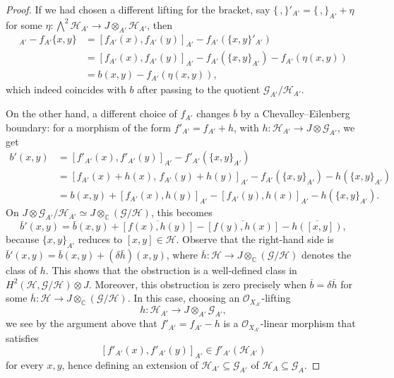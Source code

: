 \documentclass[10pt,a4paper]{amsart}
\newcommand\C{\mathbb{C}}
\newcommand{\OO}{\mathcal{O}}
\begin{document}
\begin{proof}
If we had chosen a different lifting for the bracket, say $\{\,,\}'_{A'}=\{\,,\}_{A'}+\eta$ for some $\eta:\bigwedge^2\mathcal H_{A'}\to J\otimes_{A'}\mathcal H_{A'}$, then 
\begin{align*}
[f_{A'}(x),f_{A'}(y)]_{A'} - f_{A'}\{x,y\}
&=[f_{A'}(x),f_{A'}(y)]_{A'}-f_{A'}(\{x,y\}'_{A'}) \\
&=[f_{A'}(x),f_{A'}(y)]_{A'}-f_{A'}(\{x,y\}_{A'})-f_{A'}(\eta(x,y)) \\
&=b(x,y)-f_{A'}(\eta(x,y)),
\end{align*}
which indeed coincides with $b$ after passing to the quotient $\mathcal G_{A'}/\mathcal H_{A'}$.

On the other hand, a different choice of $f_{A'}$ changes $\overline{b}$ by a Chevalley--Eilenberg boundary: for a morphism of the form $f'_{A'}=f_{A'}+h$, with $h:\mathcal H_{A'}\to J\otimes\mathcal G_{A'}$, we get
\begin{align*}
b'(x,y)
&=
[f'_{A'}(x),f'_{A'}(y)]_{A'}-f'_{A'}(\{x,y\}_{A'}) \\
&=
[f_{A'}(x)+h(x),\,f_{A'}(y)+h(y)]_{A'}
   -f_{A'}(\{x,y\}_{A'})-h(\{x,y\}_{A'}) \\
&=b(x,y)+[f_{A'}(x),h(y)]_{A'}-[f_{A'}(y),h(x)]_{A'}
   -h(\{x,y\}_{A'}).
\end{align*}
On $J\otimes \mathcal G_{A'}/\mathcal H_{A'}\simeq J\otimes_\C(\mathcal G/\mathcal H)$, this becomes
\[
\bar b'(x,y)
=
\bar b(x,y)
+\overline{[f(x),h(y)]}
-\overline{[f(y),h(x)]}
-\overline{h([x,y])},
\]
because $\{x,y\}_{A'}$ reduces to $[x,y]\in\mathcal H$.
Observe that the right-hand side is
$\bar b'(x,y)=\bar b(x,y)+(\delta\bar h)(x,y)$,
where $\bar h:\mathcal H\to J\otimes_\C(\mathcal G/\mathcal H)$ denotes the class of $h$. This shows that the obstruction is a well-defined class in
$
H^2(\mathcal H,\mathcal G/\mathcal H)\otimes J.
$
Moreover, this obstruction is zero precisely when $\overline{b}=\delta \overline{h} $ for some $\overline{h}:\mathcal H\to J\otimes_\C(\mathcal G/\mathcal H)$. In this case, choosing an $\OO_{X_{A'}}$-lifting
$$
h:\mathcal H_{A'}\to J\otimes_{A'} \mathcal G_{A'},
$$
we see by the argument above that $f'_{A'}=f_{A'}-h$
is a $\OO_{X_{A'}}$-linear morphism that satisfies
\[
[ f'_{A'}(x),f'_{A'}(y)]_{A'} \in f'_{A'}(\mathcal H_{A'})
\]
for every $x,y$, hence defining an extension of $\mathcal H_{A'}\subseteq \mathcal G_{A'}$ of $\mathcal H_A\subseteq \mathcal G_A$.
\end{proof}
\end{document}
